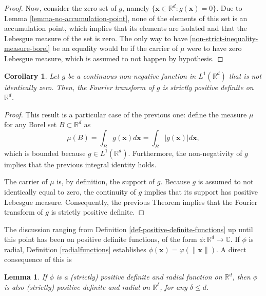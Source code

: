 \documentclass[12pt]{report} %
\newtheorem{corollary}{Corollary}
\newtheorem{lemma}{Lemma}
\newcommand{\tmmathbf}[1]{\ensuremath{\boldsymbol{#1}}}
\begin{document}
\begin{proof}
  Now, consider the zero set of $g$, namely $\{ \tmmathbf{x} \in \mathbb{R}^d
  : g (\tmmathbf{x}) = 0 \}$. Due to Lemma \ref{lemma-no-accumulation-point},
  none of the elements of this set is an accumulation point, which implies
  that its elements are isolated and that the Lebesgue measure of the set is
  zero. The only way to have \eqref{non-strict-inequality-measure-borel} be an
  equality would be if the carrier of $\mu$ were to have zero Lebesgue
  measure, which is assumed to not happen by hypothesis.
\end{proof}

\begin{corollary}\label{cor-fourier-strictly-positive-def}
  Let $g$ be a continuous non-negative function in $L^1 (\mathbb{R}^d)$ that
  is not identically zero. Then, the Fourier transform of $g$ is strictly
  positive definite on $\mathbb{R}^d$.
\end{corollary}

\begin{proof}
  This result is a particular case of the previous one: define the measure
  $\mu$ for any Borel set $B \subset \mathbb{R}^d$ as
  \[ \mu (B) = \int_B g (\tmmathbf{x}) d\tmmathbf{x}= \int_B | g
     (\tmmathbf{x}) | d\tmmathbf{x}, \]
  which is bounded because $g \in L^1 (\mathbb{R}^d)$. Furthermore, the
  non-negativity of $g$ implies that the previous integral identity holds.
  
  The carrier of $\mu$ is, by definition, the support of $g$. Because $g$ is
  assumed to not identically equal to zero, the continuity of $g$ implies that
  its support has positive Lebesgue measure. Consequently, the previous
  Theorem implies that the Fourier transform of $g$ is strictly positive
  definite.
\end{proof}

The discussion ranging from Definition \ref{def-positive-definite-functions}
up until this point has been on positive definite functions, of the form $\phi
: \mathbb{R}^d \rightarrow \mathbb{C}$. If $\phi$ is radial, Definition
\ref{radialfunctions} establishes $\phi (\tmmathbf{x}) = \varphi (\|
\tmmathbf{x} \|)$. A direct consequence of this is

\begin{lemma}
  If $\phi$ is a (strictly) positive definite and radial function on
  $\mathbb{R}^d$, then $\phi$ is also (strictly) positive definite and radial
  on $\mathbb{R}^{\delta}$, for any $\delta \leq d$.
\end{lemma}
\end{document}
